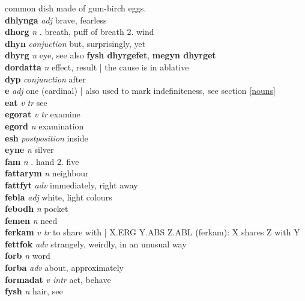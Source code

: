 common dish made of gum-birch eggs.\\\textbf{dhlynga}   \emph{adj} \textperiodcentered brave, fearless\\\textbf{dhorg}   \emph{n} . breath, puff of breath 2. wind \\\textbf{dhyn}   \emph{conjuction} \textperiodcentered but, surprisingly, yet\\\textbf{dhyrg}   \emph{n} \textperiodcentered eye, see also \textbf{fysh dhyrgefet}, \textbf{megyn dhyrget}\\\textbf{dordatta}   \emph{n} \textperiodcentered effect, result | the cause is in ablative\\\textbf{dyp}   \emph{conjunction} \textperiodcentered after\\\textbf{e}   \emph{adj} \textperiodcentered one (cardinal) | also used to mark indefiniteness, see section \ref{nouns}\\\textbf{eat}   \emph{v tr} \textperiodcentered see\\\textbf{egorat}   \emph{v tr} \textperiodcentered examine\\\textbf{egord}   \emph{n} \textperiodcentered examination\\\textbf{esh}   \emph{postposition} \textperiodcentered inside\\\textbf{eyne}   \emph{n} \textperiodcentered silver\\\textbf{fam}   \emph{n} . hand 2. five \\\textbf{fattarym}   \emph{n} \textperiodcentered neighbour\\\textbf{fattfyt}   \emph{adv} \textperiodcentered immediately, right away\\\textbf{febla}   \emph{adj} \textperiodcentered white, light colours\\\textbf{febodh}   \emph{n} \textperiodcentered pocket\\\textbf{femen}   \emph{n} \textperiodcentered need\\\textbf{ferkam}   \emph{v tr} \textperiodcentered to share with | X.ERG Y.ABS Z.ABL (ferkam): X shares Z with Y\\\textbf{fettfok}   \emph{adv} \textperiodcentered strangely, weirdly, in an unusual way\\\textbf{forb}   \emph{n} \textperiodcentered word\\\textbf{forba}   \emph{adv} \textperiodcentered about, approximately\\\textbf{formadat}   \emph{v intr} \textperiodcentered act, behave\\\textbf{fysh}   \emph{n} \textperiodcentered hair, see 